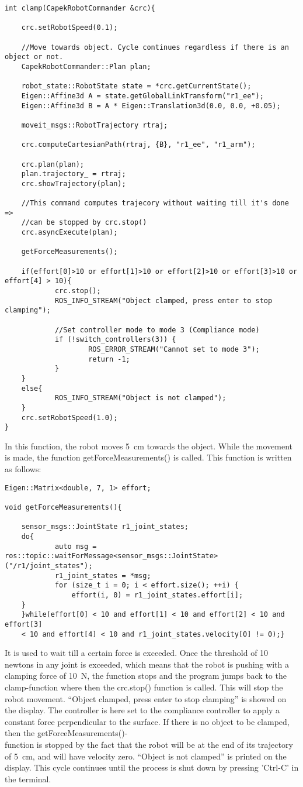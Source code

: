 \documentclass[11pt,a4paper]{report}
\begin{document}
\begin{verbatim}
int clamp(CapekRobotCommander &crc){
	
	crc.setRobotSpeed(0.1);
	
	//Move towards object. Cycle continues regardless if there is an object or not.
	CapekRobotCommander::Plan plan;

	robot_state::RobotState state = *crc.getCurrentState();
	Eigen::Affine3d A = state.getGlobalLinkTransform("r1_ee");
	Eigen::Affine3d B = A * Eigen::Translation3d(0.0, 0.0, +0.05);

	moveit_msgs::RobotTrajectory rtraj;

	crc.computeCartesianPath(rtraj, {B}, "r1_ee", "r1_arm");

	crc.plan(plan);
	plan.trajectory_ = rtraj;
	crc.showTrajectory(plan);

	//This command computes trajecory without waiting till it's done =>
	//can be stopped by crc.stop()
	crc.asyncExecute(plan);

	getForceMeasurements();

	if(effort[0]>10 or effort[1]>10 or effort[2]>10 or effort[3]>10 or effort[4] > 10){
		    crc.stop();
		    ROS_INFO_STREAM("Object clamped, press enter to stop clamping");
		    	
		    //Set controller mode to mode 3 (Compliance mode)
		    if (!switch_controllers(3)) {
			        ROS_ERROR_STREAM("Cannot set to mode 3");
			        return -1;
		    }
	}
	else{
		    ROS_INFO_STREAM("Object is not clamped");
	}
	crc.setRobotSpeed(1.0);
}
\end{verbatim}
In this function, the robot moves 5~cm towards the object. While the movement is made, the function getForceMeasurements() is called. This function is written as follows:
\begin{verbatim}
Eigen::Matrix<double, 7, 1> effort;

void getForceMeasurements(){

	sensor_msgs::JointState r1_joint_states;
	do{
		    auto msg = ros::topic::waitForMessage<sensor_msgs::JointState>("/r1/joint_states");
		    r1_joint_states = *msg;
		    for (size_t i = 0; i < effort.size(); ++i) {
        		effort(i, 0) = r1_joint_states.effort[i];
    }
	}while(effort[0] < 10 and effort[1] < 10 and effort[2] < 10 and effort[3]
	< 10 and effort[4] < 10 and r1_joint_states.velocity[0] != 0);}
\end{verbatim}
It is used to wait till a certain force is exceeded. Once the threshold of 10 newtons in any joint is exceeded, which means that the robot is pushing with a clamping force of 10~N, the function stops and the program jumps back to the clamp-function where then the crc.stop() function is called. This will stop the robot movement. ``Object clamped, press enter to stop clamping'' is showed on the display. The controller is here set to the compliance controller to apply a constant force perpendicular to the surface. If there is no object to be clamped, then the getForceMeasurements()-\\ function is stopped by the fact that the robot will be at the end of its trajectory of 5~cm, and will have velocity zero. ``Object is not clamped'' is printed on the display. This cycle continues until the process is shut down by pressing 'Ctrl-C' in the terminal.
\end{document}

